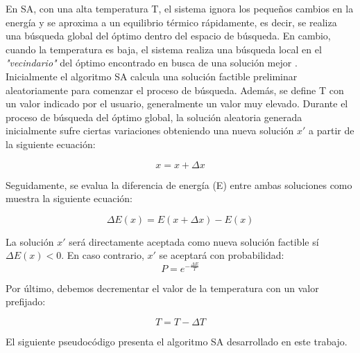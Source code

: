 En SA, con una alta temperatura T, el sistema ignora los pequeños cambios en la energía y se aproxima a un equilibrio térmico rápidamente, es decir, se realiza una búsqueda global del óptimo dentro del espacio de búsqueda. En cambio, cuando la temperatura es baja, el sistema realiza una búsqueda local en el \textit{"vecindario"} del óptimo encontrado en busca de una solución mejor \cite{metabook}. \\

Inicialmente el algoritmo SA calcula una solución factible preliminar aleatoriamente para comenzar el proceso de búsqueda. Además, se define T con un valor indicado por el usuario, generalmente un valor muy elevado.
Durante el proceso de búsqueda del óptimo global, la solución aleatoria generada inicialmente sufre ciertas variaciones obteniendo una nueva solución $x'$ a partir de la siguiente ecuación: 

\begin{equation}\label{eq:perturbation}
    x = x + \Delta x
\end{equation}

Seguidamente, se evalua la diferencia de energía (E) entre ambas soluciones como muestra la siguiente ecuación:

\begin{equation}\label{eq:evaluate}
    \Delta E(x) = E(x + \Delta x) - E(x)
\end{equation}

La solución $x'$ será directamente aceptada como nueva solución factible sí \\ $\Delta E(x) < 0$. En caso contrario, $x'$ se aceptará con probabilidad: \\

\begin{equation}\label{eq:other}
    P = e^{- \frac{\Delta E}{T}}
\end{equation}

Por último, debemos decrementar el valor de la temperatura con un valor prefijado: 

\begin{equation} \label{eq:decreaseT}
    T = T - \Delta T
\end{equation}

El siguiente pseudocódigo presenta el algoritmo SA desarrollado en este trabajo. 

\newpage

